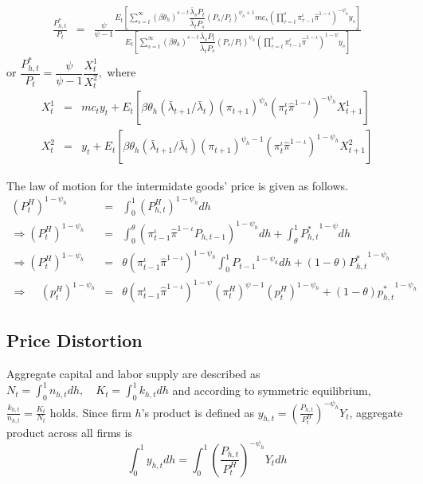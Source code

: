 \documentclass[11pt,titlepage]{article}
\begin{document}
\begin{eqnarray*}
\frac{P_{h,t}^*}{P_t} &=& \frac{\psi}{\psi-1}\frac{E_t\left[\sum_{s=t}^{\infty} (\beta\theta_h)^{s-t}\dfrac{\bar{\lambda}_s P_t}{\bar{\lambda}_t P_s} (P_s/P_t)^{\psi_h+1}mc_s \left(\prod_{\tau=t}^s\pi_{\tau-1}^\iota \hat{\pi}^{1-\iota}\right)^{-\psi_h} y_s\right]}
{E_t \left[  \sum_{s=t}^{\infty}  (\beta\theta_h)^{s-t} \dfrac{\bar{\lambda}_s P_t}{\bar{\lambda}_t P_s}(P_s/P_t)^{\psi_h} \left(\prod_{\tau=t}^s\pi_{\tau-1}^\iota \hat{\pi}^{1-\iota} \right)^{1-\psi}y_s \right]}\end{eqnarray*}
or $\dfrac{P_{h,t}^*}{P_t}=\dfrac{\psi}{\psi-1}\dfrac{X_t^1}{X_t^2},$ where
\begin{eqnarray*}
X_t^1 &=& mc_t y_t + E_t\left[\beta\theta_h(\bar{\lambda}_{t+1}/\bar{\lambda}_t) (\pi_{t+1})^{\psi_h} (\pi_{t}^\iota \hat{\pi}^{1-\iota})^{-\psi_h}X_{t+1}^1\right]\\
X_t^2 &=& y_t + E_t\left[\beta\theta_h(\bar{\lambda}_{t+1}/\bar{\lambda}_t) (\pi_{t+1})^{\psi_h-1} (\pi_{t}^\iota \hat{\pi}^{1-\iota})^{1-\psi_h}X_{t+1}^2\right]
\end{eqnarray*}


The law of motion for the intermidate goods' price is given as follows.
\begin{eqnarray*}
(P^H_{t})^{1-\psi_h} &=&  \int_0^1 (P_{h,t}^H)^{1-\psi_h} dh  \\
\Rightarrow (P^H_{t})^{1-\psi_h} &=&  \int_0^{\theta} \left( \pi_{t-1}^\iota \hat{\pi}^{1-\iota} P_{h,t-1} \right)^{1-\psi_h} dh + \int_{\theta}^1 {P_{h,t}^{*}}^{1-\psi} dh \\  
\Rightarrow (P^H_{t})^{1-\psi_h} &=&  {\theta} {(\pi_{t-1}^\iota \hat{\pi}^{1-\iota})}^{1-\psi_h}\int_0^1 {P_{t-1}}^{1-\psi_h}dh  + (1-\theta){P_{h,t}^{*}}^{1-\psi_h} \\
\Rightarrow~~~~~ ({p^H_{t}})^{1-\psi_h} &=&  {\theta} {(\pi_{t-1}^\iota \hat{\pi}^{1-\iota})}^{1-\psi} (\pi^H_t)^{\psi-1}({p^H_{t}})^{1-\psi_h} + (1-\theta){p_{h,t}^{*}}^{1-\psi_h}
\end{eqnarray*} 


\subsection{Price Distortion}
\normalsize

Aggregate capital and labor supply are described as
$N_t = \int_0^1 n_{h,t} dh,   \quad K_t = \int_0^1 k_{h,t} dh$
and according to symmetric equilibrium, $\frac{k_{h,t}}{n_{h,t}} = \frac{K_t}{N_t}$ holds. Since firm $h$'s product is defined as $y_{h,t} = \left(\frac{P_{h,t}}{P^H_t} \right)^{-\psi_h} Y_t$, aggregate product across all firms is 
\begin{displaymath}
\int_0^1 y_{h,t} dh = \int_0^1 \left(\frac{P_{h,t}}{P^H_t} \right)^{-\psi_h} Y_t dh 
\end{displaymath}
\end{document}
